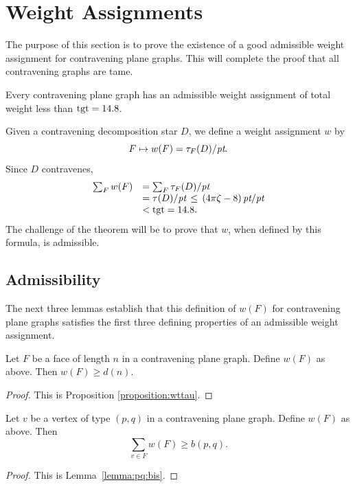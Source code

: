 \chapter{Weight Assignments}
    \label{sec:weight}

The purpose of this section is to prove the existence of a good
admissible weight assignment for contravening plane graphs.  This
will complete the proof that all contravening graphs are tame.

\begin{theorem}  Every contravening plane graph has an admissible
weight assignment of total weight less than ${\operatorname{tgt}}=14.8$.
\end{theorem}

Given a contravening decomposition star $D$, we define a weight
assignment $w$ by
    $$F \mapsto w(F) = \tau_F(D)/\hbox{\it pt}.$$
Since $D$ contravenes,
    $$
    \begin{array}{lll}
    \sum_F w(F) &= \sum_F \tau_F(D)/\hbox{\it pt} \\
            &= \tau(D)/\hbox{\it pt}\,\le\,(4\pi\zeta-8)\,\hbox{\it pt}/\hbox{\it pt} \\
        &< {\operatorname{tgt}}=14.8.
    \end{array}
    $$
The challenge of the theorem will be to prove that $w$, when
defined by this formula, is admissible.

\section{Admissibility}
\label{sec:admissibility}

The next three lemmas establish that this definition of $w(F)$ for
contravening plane graphs satisfies the first three defining
properties of an admissible weight assignment.

\begin{lemma}  Let $F$ be a face of length $n$ in a contravening plane graph.
Define $w(F)$ as above. Then
        $w(F) \ge d(n)$.
\end{lemma}

\begin{proof} This is Proposition \ref{proposition:wttau}.
\end{proof}

\begin{lemma} Let $v$ be a vertex of type $(p,q)$ in a
contravening plane graph.  Define $w(F)$ as above. Then
        $$\sum_{v\in F} w(F) \ge b(p,q).$$
\end{lemma}


\begin{proof} This is Lemma~\ref{lemma:pq:bis}.
\end{proof}

